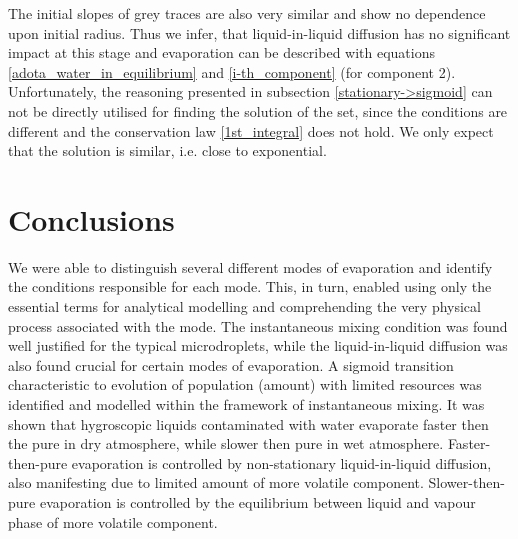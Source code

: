 \documentclass[twoside,twocolumn,9pt]{article}
\begin{document}
The initial slopes of grey traces are also very similar and show no dependence upon initial radius. Thus we infer, that liquid-in-liquid diffusion has no significant impact at this stage and evaporation can be described with equations \ref{adota_water_in_equilibrium} and \ref{i-th_component} (for component 2). Unfortunately, the reasoning presented in subsection \ref{stationary->sigmoid} can not be directly utilised for finding the solution of the set, since the conditions are different and the conservation law \ref{1st_integral} does not hold. We only expect that the solution is similar, i.e. close to exponential.


\section{Conclusions}
We were able to distinguish several different modes of evaporation and identify the conditions responsible for each mode. This, in turn, enabled using only the essential terms for analytical modelling and comprehending the very physical process associated with the mode. The instantaneous mixing condition was found well justified for the typical microdroplets, while the liquid-in-liquid diffusion was also found crucial for certain modes of evaporation. A sigmoid transition characteristic to evolution of population (amount) with limited resources was identified and modelled within the framework of instantaneous mixing. It was shown that hygroscopic liquids contaminated with water evaporate faster then the pure in dry atmosphere, while slower then pure in wet atmosphere. Faster-then-pure evaporation is controlled by non-stationary liquid-in-liquid diffusion, also manifesting due to limited amount of more volatile component. Slower-then-pure evaporation is controlled by the equilibrium between liquid and vapour phase of more volatile component.





\balance



\end{document}
